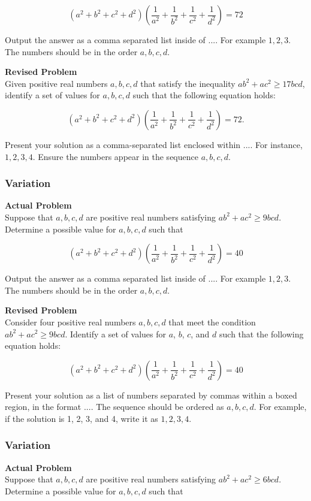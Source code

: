$$(a^2+b^2+c^2+d^2)\left(\frac{1}{a^2}+\frac{1}{b^2}+\frac{1}{c^2}+\frac{1}{d^2}\right) = 72$$

Output the answer as a comma separated list inside of $\boxed{...}$. For example $\boxed{1, 2, 3}$.
The numbers should be in the order $a,b,c,d$.

\textbf{Revised Problem}\\
Given positive real numbers $a, b, c, d$ that satisfy the inequality $ab^2 + ac^2 \geq 17bcd$, identify a set of values for $a, b, c, d$ such that the following equation holds:

$$(a^2+b^2+c^2+d^2)\left(\frac{1}{a^2}+\frac{1}{b^2}+\frac{1}{c^2}+\frac{1}{d^2}\right) = 72.$$

Present your solution as a comma-separated list enclosed within $\boxed{...}$. For instance, $\boxed{1, 2, 3, 4}$. Ensure the numbers appear in the sequence $a, b, c, d$.

\subsubsection{Variation}
\textbf{Actual Problem}\\
Suppose that $a,b,c,d$ are positive real numbers satisfying $ab^2 + ac^2 \geq 9bcd$. Determine a possible value for $a,b,c,d$ such that

$$(a^2+b^2+c^2+d^2)\left(\frac{1}{a^2}+\frac{1}{b^2}+\frac{1}{c^2}+\frac{1}{d^2}\right) = 40$$

Output the answer as a comma separated list inside of $\boxed{...}$. For example $\boxed{1, 2, 3}$.
The numbers should be in the order $a,b,c,d$.

\textbf{Revised Problem}\\
Consider four positive real numbers $a, b, c, d$ that meet the condition $ab^2 + ac^2 \geq 9bcd$. Identify a set of values for $a$, $b$, $c$, and $d$ such that the following equation holds:

$$(a^2+b^2+c^2+d^2)\left(\frac{1}{a^2}+\frac{1}{b^2}+\frac{1}{c^2}+\frac{1}{d^2}\right) = 40$$

Present your solution as a list of numbers separated by commas within a boxed region, in the format $\boxed{...}$. The sequence should be ordered as $a,b,c,d$. For example, if the solution is 1, 2, 3, and 4, write it as $\boxed{1, 2, 3, 4}$.

\subsubsection{Variation}
\textbf{Actual Problem}\\
Suppose that $a,b,c,d$ are positive real numbers satisfying $ab^2 + ac^2 \geq 6bcd$. Determine a possible value for $a,b,c,d$ such that


